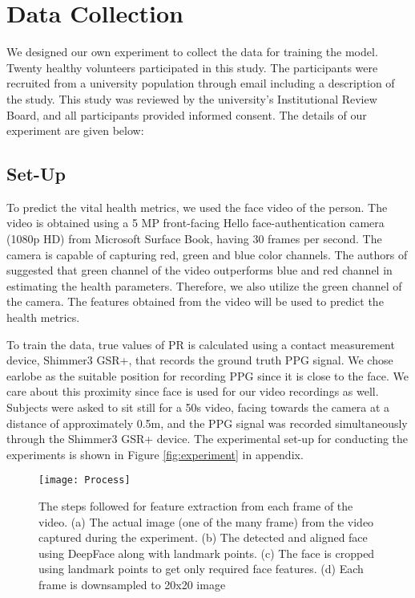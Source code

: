 \section{Data Collection}\label{sec:data}
We designed our own experiment to collect the data for training the model. Twenty healthy volunteers participated in this study. The participants were recruited from a university population through email including a description of the study. This study was reviewed by the university's Institutional Review Board, and all participants provided informed consent. The details of our experiment are given below:
\subsection{Set-Up}
To predict the vital health metrics, we used the face video of the person. The video is obtained using a 5 MP front-facing Hello face-authentication camera (1080p HD) from Microsoft Surface Book, having 30 frames per second.  %
The camera is capable of capturing red, green and blue color channels. The authors of \cite{verkruysse2008remote} suggested that green channel of the video outperforms blue and red channel in estimating the health parameters. Therefore, we also utilize the green channel of the camera. The features obtained from the video will be used to predict the health metrics. 

To train the data, true values of PR is calculated using a contact measurement device, Shimmer3 GSR+, that records the ground truth PPG signal. We chose earlobe as the suitable position for recording PPG since it is close to the face. We care about this proximity since face is used for our video recordings as well. Subjects were asked to sit still for a 50s video, facing towards the camera at a distance of approximately 0.5m, and the PPG signal was recorded simultaneously through the Shimmer3 GSR+ device. The experimental set-up for conducting the experiments is shown in Figure \ref{fig:experiment} in appendix.  

\begin{figure*}[htbp]
	\centering
	\texttt{[image: Process]}
	
	\caption{The steps followed for feature extraction from each frame of the video. (a) The actual image (one of the many frame) from the video captured during the experiment. (b) The detected and aligned face using DeepFace along with landmark points. (c) The face is cropped using landmark points to get only required face features. (d) Each frame is downsampled to 20x20 image}
		\vspace{-.2in}
	
	\label{fig:process}
\end{figure*}

